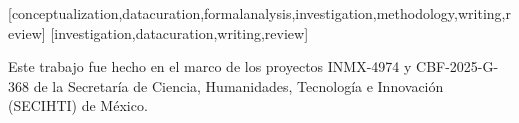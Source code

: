 \documentclass[spanish]{textolivre}
\begin{document}
\begin{contributors}
[conceptualization,datacuration,formalanalysis,investigation,methodology,writing,review]
[investigation,datacuration,writing,review]
\end{contributors}

\begin{dataavailability}
\end{dataavailability}

\begin{funding}
Este trabajo fue hecho en el marco de los proyectos INMX-4974 y CBF-2025-G-368 de la Secretaría de Ciencia, Humanidades, Tecnología e Innovación (SECIHTI) de México. 
\end{funding}
\end{document}
